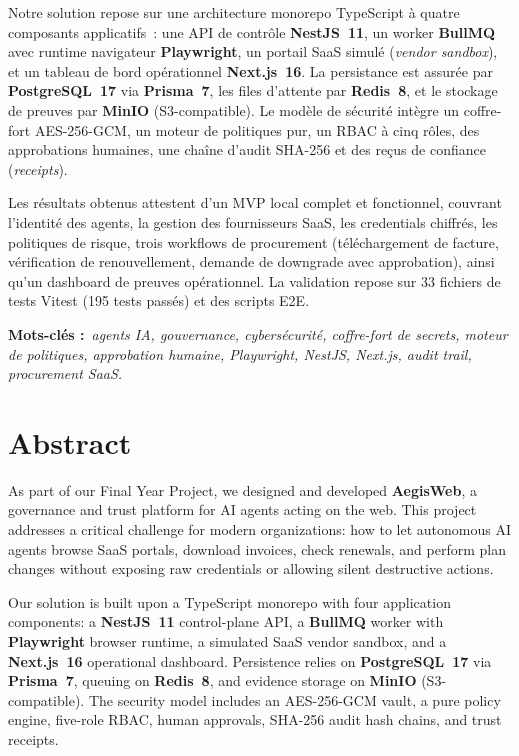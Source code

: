 \documentclass[12pt,a4paper,oneside]{report}
\begin{document}
\medskip
Notre solution repose sur une architecture monorepo TypeScript à quatre
composants applicatifs~: une API de contrôle \textbf{NestJS~11}, un worker
\textbf{BullMQ} avec runtime navigateur \textbf{Playwright}, un portail
SaaS simulé (\textit{vendor sandbox}), et un tableau de bord opérationnel
\textbf{Next.js~16}. La persistance est assurée par \textbf{PostgreSQL~17}
via \textbf{Prisma~7}, les files d'attente par \textbf{Redis~8}, et le
stockage de preuves par \textbf{MinIO} (S3-compatible). Le modèle de
sécurité intègre un coffre-fort AES-256-GCM, un moteur de politiques pur,
un RBAC à cinq rôles, des approbations humaines, une chaîne d'audit
SHA-256 et des reçus de confiance (\textit{receipts}).

\medskip
Les résultats obtenus attestent d'un MVP local complet et fonctionnel,
couvrant l'identité des agents, la gestion des fournisseurs SaaS, les
credentials chiffrés, les politiques de risque, trois workflows de
procurement (téléchargement de facture, vérification de renouvellement,
demande de downgrade avec approbation), ainsi qu'un dashboard de preuves
opérationnel. La validation repose sur 33 fichiers de tests Vitest
(195 tests passés) et des scripts E2E.

\medskip\noindent
\textbf{Mots-clés :}~\textit{agents IA, gouvernance, cybersécurité,
coffre-fort de secrets, moteur de politiques, approbation humaine,
Playwright, NestJS, Next.js, audit trail, procurement SaaS.}

\clearpage
\chapter*{Abstract}
\thispagestyle{plain}

As part of our Final Year Project, we designed and developed
\textbf{AegisWeb}, a governance and trust platform for AI agents acting
on the web. This project addresses a critical challenge for modern
organizations: how to let autonomous AI agents browse SaaS portals,
download invoices, check renewals, and perform plan changes without
exposing raw credentials or allowing silent destructive actions.

\medskip
Our solution is built upon a TypeScript monorepo with four application
components: a \textbf{NestJS~11} control-plane API, a \textbf{BullMQ}
worker with \textbf{Playwright} browser runtime, a simulated SaaS vendor
sandbox, and a \textbf{Next.js~16} operational dashboard. Persistence
relies on \textbf{PostgreSQL~17} via \textbf{Prisma~7}, queuing on
\textbf{Redis~8}, and evidence storage on \textbf{MinIO} (S3-compatible).
The security model includes an AES-256-GCM vault, a pure policy engine,
five-role RBAC, human approvals, SHA-256 audit hash chains, and trust
receipts.
\end{document}
